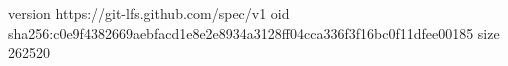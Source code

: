 version https://git-lfs.github.com/spec/v1
oid sha256:c0e9f4382669aebfacd1e8e2e8934a3128ff04cca336f3f16bc0f11dfee00185
size 262520
